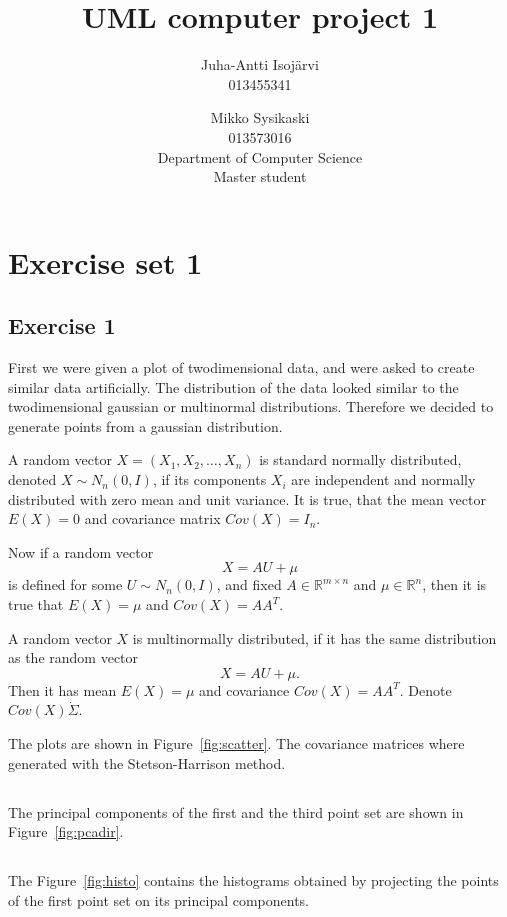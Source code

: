 \documentclass{article}
\begin{document}
\title{UML computer project 1}
\author{
Juha-Antti Isojärvi\\
013455341
\and
Mikko Sysikaski\\
013573016\\
Department of Computer Science\\
Master student}
\date{}
\maketitle

\section{Exercise set 1}
\subsection{Exercise 1}
First we were given a plot of twodimensional data, and were asked to
create similar data artificially. The distribution of the data looked
similar to the twodimensional gaussian or multinormal
distributions. Therefore we decided to generate points from a
gaussian distribution. 

A random vector $X = (X_1, X_2, \dots, X_n)$ is standard normally
distributed, denoted $X \sim N_n(0,I)$, if its components $X_i$ are independent and normally
distributed with zero mean and unit variance. It is true, that the
mean vector $E(X) = 0$ and covariance matrix $Cov(X) = I_n$.

Now if a random vector 
\[
X = AU + \mu
\] 
is defined for some $U \sim N_n(0,I)$, and fixed $A \in \mathbb{R}^{m \times n}$
and $\mu \in \mathbb{R}^n$, then it is true that $E(X) = \mu$ and
$Cov(X) = AA^T$.

A random vector $X$ is multinormally
distributed, if it has the same
distribution as the random vector
\[
X = AU + \mu.
\]
Then it has mean $E(X) = \mu$ and covariance $Cov(X) = AA^T$. Denote
$Cov(X) \dot \Sigma$. 

The plots are shown in Figure~\ref{fig:scatter}. The covariance matrices where generated with the Stetson-Harrison method.
\subsection{}
The principal components of the first and the third point set are shown in Figure~\ref{fig:pcadir}.
\subsection{}
The Figure~\ref{fig:histo} contains the histograms obtained by projecting the points of the first point set on its principal components.
\end{document}
